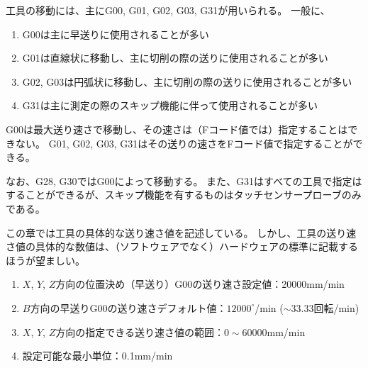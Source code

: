 


工具の移動には、主に{\ttfamily G00}, {\ttfamily G01}, {\ttfamily G02}, {\ttfamily G03}, {\ttfamily G31}が用いられる。
一般に、
\begin{enumerate}[label=\sarrow]
\item {\ttfamily G00}は主に早送りに使用されることが多い
\item {\ttfamily G01}は直線状に移動し、主に切削の際の送りに使用されることが多い
\item {\ttfamily G02}, {\ttfamily G03}は円弧状に移動し、主に切削の際の送りに使用されることが多い
\item {\ttfamily G31}は主に測定の際のスキップ機能に伴って使用されることが多い
\end{enumerate}
{\ttfamily G00}は最大送り速さで移動し、その速さは（Fコード値では）指定することはできない。
{\ttfamily G01}, {\ttfamily G02}, {\ttfamily G03}, {\ttfamily G31}はその送りの速さをFコード値で指定することができる。

なお、{\ttfamily G28}, {\ttfamily G30}では{\ttfamily G00}によって移動する。
また、{\ttfamily G31}はすべての工具で指定はすることができるが、スキップ機能を有するものはタッチセンサープローブのみである。
\begin{marker}
この章では工具の具体的な送り速さ値を記述している。
しかし、工具の送り速さ値の具体的な数値は、（ソフトウェアでなく）ハードウェアの標準に記載するほうが望ましい。
\end{marker}



\begin{enumerate}[label=\sarrow]
\item $X$, $Y$, $Z$方向の位置決め（早送り）{\ttfamily G00}の送り速さ設定値：20000mm/min
\item $B$方向の早送り{\ttfamily G00}の送り速さデフォルト値：$12000^\circ$/min ($\sim 33.33$回転/min)
\item $X$, $Y$, $Z$方向の指定できる送り速さ値の範囲：$0\sim60000$mm/min
\item 設定可能な最小単位：0.1mm/min
\end{enumerate}



